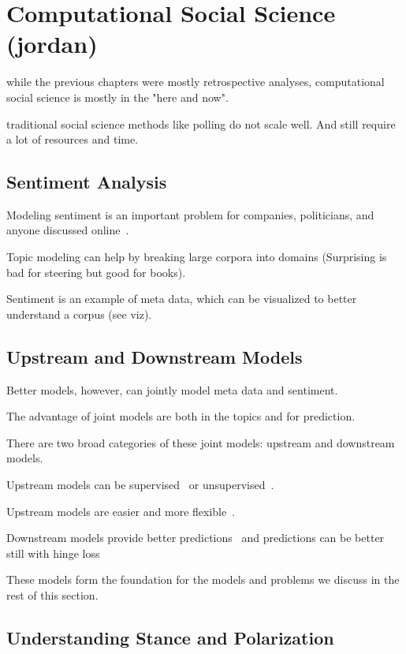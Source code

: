 
\chapter{Computational Social Science (jordan)}
\label{ch:css}

 while the previous chapters were mostly retrospective analyses, computational social science is mostly in the "here and now".

 traditional social science methods like polling do not scale well. And still require a lot of resources and time.

\section{Sentiment Analysis}

Modeling sentiment is an important problem for companies, politicians,
and anyone discussed online~\cite{pang-08}. 

Topic modeling can help by breaking large corpora into domains
(Surprising is bad for steering but good for books).

Sentiment is an example of meta data, which can be visualized to
better understand a corpus (see viz).

\section{Upstream and Downstream Models}

Better models, however, can jointly model meta data and sentiment.  

The advantage of joint models are both in the topics and for
prediction.

There are two broad categories of these joint models: upstream and
downstream models.

Upstream models can be supervised~\cite{mimno-08} or
unsupervised~\cite{lin-09}.

Upstream models are easier and more flexible~\cite{stewart-14}.

Downstream models provide better predictions~\cite{blei-07b} and
predictions can be better still with hinge loss~\cite{zhu-09}

These models form the foundation for the models and problems we
discuss in the rest of this section. 

\section{Understanding Stance and Polarization}

